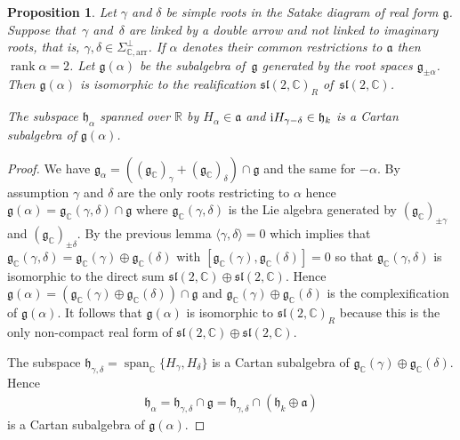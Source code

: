 \documentclass[pdftex]{sigma}
\numberwithin{equation}{section}
\newtheorem{Proposition}[Theorem]{Proposition}
 { \theoremstyle{definition}
\newtheorem{Definition}[Theorem]{Definition}
\newtheorem{Note}[Theorem]{Note}
\newtheorem{Example}[Theorem]{Example}
\newtheorem{Remark}[Theorem]{Remark} }
\begin{document}
\begin{Proposition}\label{propEsseeleC}Let $\gamma $ and $\delta $ be simple roots in the Satake diagram of real form $\mathfrak{g}$. Suppose that~$\gamma $ and~$\delta $ are linked by a double arrow and not linked to imaginary roots, that is, $\gamma,\delta \in \Sigma _{\mathbb{C},\mathrm{arr}}^{\bot }$. If $\alpha $ denotes their common restrictions to $\mathfrak{a}$ then $\operatorname{rank} \alpha =2$. Let $\mathfrak{g} (\alpha) $ be the subalgebra of~$\mathfrak{g}$ generated by the root spaces $\mathfrak{g}_{\pm \alpha }$. Then $\mathfrak{g}(\alpha) $ is isomorphic to the realification $\mathfrak{sl}(2,\mathbb{C}) _{R}$ of~$\mathfrak{sl}(2,\mathbb{C}) $.

The subspace $\mathfrak{h}_{\alpha }$ spanned over $\mathbb{R}$ by $H_{\alpha }\in \mathfrak{a}$ and ${\rm i}H_{\gamma -\delta }\in \mathfrak{h}_{k}$ is a Cartan subalgebra of $\mathfrak{g}(\alpha) $.
\end{Proposition}

\begin{proof}We have $\mathfrak{g}_{\alpha }=( ( \mathfrak{g}_{\mathbb{C}}) _{\gamma }+( \mathfrak{g}_{\mathbb{C}}) _{\delta}) \cap \mathfrak{g}$ and the same for $-\alpha $. By assumption $\gamma $ and $\delta $ are the only roots restricting to $\alpha $ hence $\mathfrak{g}(\alpha) =\mathfrak{g}_{\mathbb{C}}( \gamma,\delta ) \cap \mathfrak{g}$ where $\mathfrak{g}_{\mathbb{C}}(\gamma,\delta) $ is the Lie algebra generated by $( \mathfrak{g}_{\mathbb{C}}) _{\pm \gamma }$ and $( \mathfrak{g}_{\mathbb{C}}) _{\pm \delta }$. By the previous lemma $\langle \gamma,\delta\rangle =0$ which implies that $\mathfrak{g}_{\mathbb{C}}( \gamma,\delta ) =\mathfrak{g}_{\mathbb{C}}(\gamma) \oplus\mathfrak{g}_{\mathbb{C}}(\delta) $ with $[\mathfrak{g}_{\mathbb{C}}(\gamma),\mathfrak{g}_{\mathbb{C}}( \delta) ]=0$ so that $\mathfrak{g}_{\mathbb{C}}( \gamma,\delta)
$ is isomorphic to the direct sum $\mathfrak{sl}( 2,\mathbb{C}) \oplus \mathfrak{sl}( 2,\mathbb{C}) $. Hence $\mathfrak{g}(\alpha) =( \mathfrak{g}_{\mathbb{C}}(\gamma)\oplus \mathfrak{g}_{\mathbb{C}}(\delta) ) \cap \mathfrak{g}$ and $\mathfrak{g}_{\mathbb{C}}(\gamma) \oplus \mathfrak{g}_{\mathbb{C}}(\delta) $ is the complexification of $\mathfrak{g}(\alpha) $. It follows that $\mathfrak{g}(\alpha) $ is isomorphic to $\mathfrak{sl}( 2,\mathbb{C}) _{R}$ because this is the only non-compact real form of $\mathfrak{sl} ( 2,\mathbb{C} ) \oplus \mathfrak{sl}(2,\mathbb{C}) $.

The subspace $\mathfrak{h}_{\gamma,\delta }=\operatorname{span}_{\mathbb{C}}\{H_{\gamma },H_{\delta }\}$ is a Cartan subalgebra of $\mathfrak{g}_{\mathbb{C}}(\gamma) \oplus \mathfrak{g}_{\mathbb{C}}(\delta) $. Hence
\begin{gather*}
\mathfrak{h}_{\alpha }=\mathfrak{h}_{\gamma,\delta }\cap \mathfrak{g}=\mathfrak{h}_{\gamma,\delta }\cap ( \mathfrak{h}_{k}\oplus \mathfrak{a})
\end{gather*}
is a Cartan subalgebra of $\mathfrak{g}(\alpha) $.
\end{proof}
\end{document}

